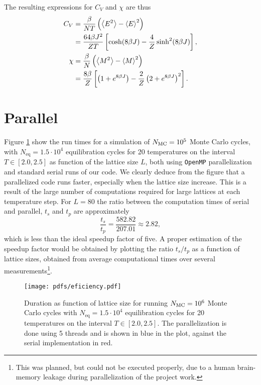 The resulting expressions for $C_V$ and $\chi$ are thus 
\begin{align}
    C_V &= \frac{\beta}{N T}\left( \expval{E^2} - \expval{E}^2 \right) \nonumber \\ 
    &= \frac{64\beta J^2}{Z T} \left[ \cosh(8\beta J) - \frac{4}{Z}\sinh^2(8\beta J) \right], \label{eq:analytical_CV} \\ 
    \chi &= \frac{\beta}{N}\left( \expval{M^2} - \expval{M}^2 \right) \nonumber \\
    &= \frac{8\beta}{Z}\left[ \left( 1+e^{8\beta J} \right) - \frac{2}{Z}\left( 2+e^{8\beta J} \right)^2 \right]. \label{eq:analytical_magnetic_susceptibility}
\end{align}


\section{Parallel}\label{app:parallel}

Figure \ref{fig:efficiency} show the run times for a simulation of $N_\mathrm{MC}=10^5$ Monte Carlo cycles, with $N_\mathrm{eq} = 1.5\cdot 10^4$ equilibration cycles for 20 temperatures on the interval $T\in[2.0, 2.5]$ as function of the lattice size $L$, both using \texttt{OpenMP} parallelization and standard serial runs of our code. We clearly deduce from the figure that a parallelized code runs faster, especially when the lattice size increase. This is a result of the large number of computations required for large lattices at each temperature step. For $L=80$ the ratio between the computation times of serial and parallel, $t_s$ and $t_p$ are approximately
\begin{equation}
    \frac{t_s}{t_p}=\frac{582.82}{207.01}\approx2.82, 
\end{equation}  
which is less than the ideal speedup factor of five. A proper estimation of the speedup factor would be obtained by plotting the ratio $t_s/t_p$ as a function of lattice sizes, obtained from average computational times over several measurements\footnote{This was planned, but could not be executed properly, due to a human brain-memory leakage during parallelization of the project work.}.

\begin{figure}[!ht]
    \texttt{[image: pdfs/eficiency.pdf]} 
    \caption{Duration as function of lattice size for running $N_\mathrm{MC}=10^6$ Monte Carlo cycles with $N_\mathrm{eq}=1.5\cdot 10^4$ equilibration cycles for 20 temperatures on the interval $T\in[2.0,2.5]$. The parallelization is done using 5 threads and is shown in blue in the plot, against the serial implementation in red.} 
    \label{fig:efficiency}
\end{figure} 
